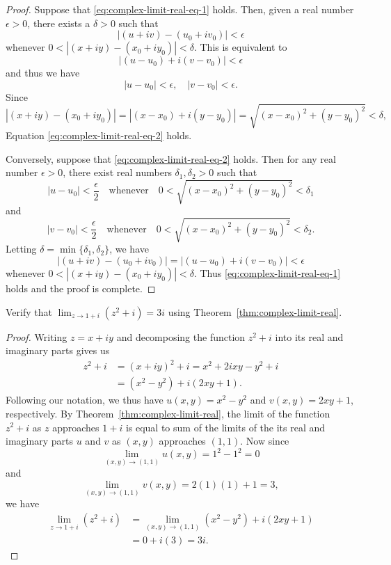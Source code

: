 \begin{proof}
    Suppose that \eqref{eq:complex-limit-real-eq-1} holds. Then, given a real number \(\epsilon > 0\), there exists a \(\delta > 0\) such that
    \[
        |(u + iv) - (u_0 + iv_0)|  < \epsilon
    \]
    whenever \(0 < |(x + iy) - (x_0 + iy_0)| < \delta\). This is equivalent to
    \[
        |(u - u_0) + i(v - v_0)| < \epsilon
    \]
    and thus we have
    \[
        |u - u_0| < \epsilon, \quad |v - v_0| < \epsilon.
    \]
    Since
    \[
        |(x + iy) - (x_0 + iy_0)| = |(x - x_0) + i(y - y_0)| = \sqrt{(x - x_0)^2 + (y - y_0)^2} < \delta,
    \]
    Equation \eqref{eq:complex-limit-real-eq-2} holds.

    Conversely, suppose that \eqref{eq:complex-limit-real-eq-2} holds. Then for any real number \(\epsilon > 0\), there exist real numbers \(\delta_1, \delta_2 > 0\) such that
    \[
        |u - u_0| < \frac{\epsilon}{2} \quad \text{whenever} \quad 0 < \sqrt{(x - x_0)^2 + (y - y_0)^2} < \delta_1
    \]
    and
    \[
        |v - v_0| < \frac{\epsilon}{2} \quad \text{whenever} \quad 0 < \sqrt{(x - x_0)^2 + (y - y_0)^2} < \delta_2.
    \]
    Letting \(\delta = \min\{\delta_1, \delta_2\}\), we have
    \[
        |(u + iv) - (u_0 + iv_0)| = |(u - u_0) + i(v - v_0)| < \epsilon
    \]
    whenever \(0 < |(x + iy) - (x_0 + iy_0)| < \delta\). Thus \eqref{eq:complex-limit-real-eq-1} holds and the proof is complete.
\end{proof}

\begin{example}
    Verify that \(\lim_{z \to 1 + i} (z^2 + i) = 3i\) using Theorem~\ref{thm:complex-limit-real}.

    \begin{proof}
        Writing \(z = x + iy\) and decomposing the function \(z^2 + i\) into its real and imaginary parts gives us
        \begin{align*}
            z^2 + i &= (x + iy)^2 + i = x^2 + 2ixy - y^2 + i\\
            &= (x^2 - y^2) + i(2xy + 1).
        \end{align*}
        Following our notation, we thus have \(u(x, y) = x^2 - y^2\) and \(v(x, y) = 2xy + 1\), respectively. By Theorem~\ref{thm:complex-limit-real}, the limit of the function \(z^2 + i\) as \(z\) approaches \(1 + i\) is equal to sum of the limits of the its real and imaginary parts \(u\) and \(v\) as \((x, y)\) approaches \((1, 1)\). Now since
        \[
            \lim_{(x, y) \to (1, 1)} u(x, y) = 1^2 - 1^2 = 0
        \]
        and
        \[
            \lim_{(x, y) \to (1, 1)} v(x, y) = 2(1)(1) + 1 = 3,
        \]
        we have
        \begin{align*}
            \lim_{z \to 1 + i} (z^2 + i) &= \lim_{(x, y) \to (1, 1)} (x^2 - y^2) + i(2xy + 1)\\
            &= 0 + i(3) = 3i.
        \end{align*}
    \end{proof}
\end{example}

